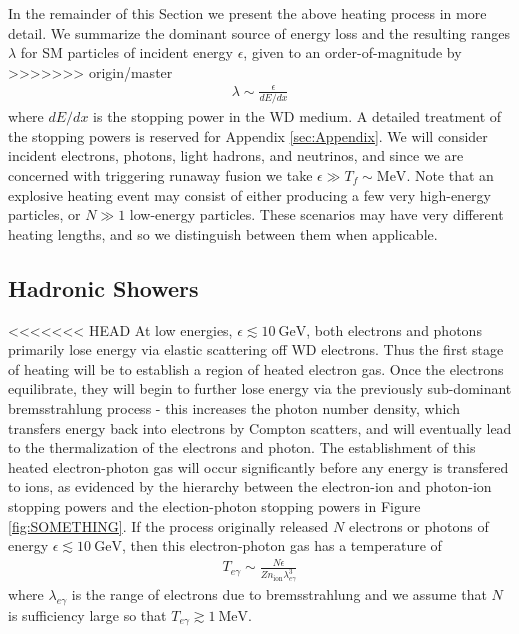 \documentclass[twocolumn, preprintnumbers,amsmath,amssymb,prd, superscriptaddress]{revtex4}
\newcommand{\GeV}{\text{GeV}}
\newcommand{\MeV}{\text{MeV}}
\begin{document}
In the remainder of this Section we present the above heating process in more detail.  
We summarize the dominant source of energy loss and the resulting ranges $\lambda$ for SM particles of incident energy $\epsilon$, given to an order-of-magnitude by
>>>>>>> origin/master
\begin{align}
    \lambda \sim \frac{\epsilon}{dE/dx}
\end{align}
where $dE/dx$ is the stopping power in the WD medium.  
A detailed treatment of the stopping powers is reserved for Appendix \ref{sec:Appendix}. 
We will consider incident electrons, photons, light hadrons, and neutrinos, and since we are concerned with triggering runaway fusion we take $\epsilon \gg T_f \sim \text{MeV}$. 
Note that an explosive heating event may consist of either producing a few very high-energy particles, or $N \gg 1$ low-energy particles.
These scenarios may have very different heating lengths, and so we distinguish between them when applicable.

\subsection{Hadronic Showers}


<<<<<<< HEAD
At low energies, $\epsilon \lesssim 10~\GeV$, both electrons and photons primarily lose energy via elastic scattering off WD electrons.
Thus the first stage of heating will be to establish a region of heated electron gas.
Once the electrons equilibrate, they will begin to further lose energy via the previously sub-dominant bremsstrahlung process - this increases the photon number density, which transfers energy back into electrons by Compton scatters, and will eventually lead to the thermalization of the electrons and photon.
The establishment of this heated electron-photon gas will occur significantly before any energy is transfered to ions, as evidenced by the hierarchy between the electron-ion and photon-ion stopping powers and the election-photon stopping powers in Figure \ref{fig:SOMETHING}.
If the process originally released $N$ electrons or photons of energy $\epsilon \lesssim 10~\GeV$, then this electron-photon gas has a temperature of
\begin{align}
  T_{e\gamma} \sim \frac{N \epsilon}{Z n_\text{ion} \lambda_{e\gamma}^3}
\end{align}
where $\lambda_{e\gamma}$ is the range of electrons due to bremsstrahlung and we assume that $N$ is sufficiency large so that $T_{e\gamma} \gtrsim 1~\MeV$.
\end{document}
